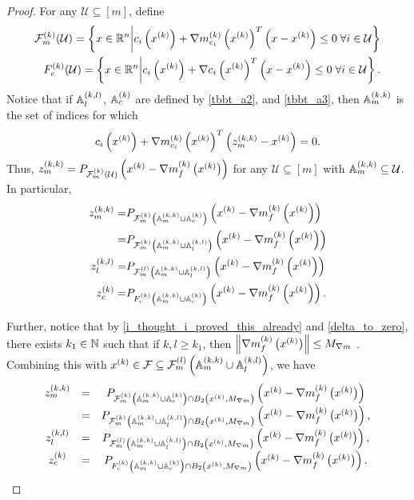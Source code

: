 \begin{proof}

For any $\mathcal U \subseteq [m]$, define
\begin{align*}
\feasiblek(\mathcal U)  = \left\{x \in \Rn \bigg| c_i\left(\xk\right) + \gmcik^T\left(x - \xk\right) \le 0 \; \forall i \in \mathcal U \right\} \\
\truefeasiblek(\mathcal U)  = \left\{x \in \Rn \bigg| c_i\left(\xk\right) + \nabla c_i\left(\xk\right)^T\left(x - \xk\right) \le 0 \; \forall i \in \mathcal U \right\}.
\end{align*}
Notice that if $\Alk$, $\Ack$
are defined by
\cref{tbbt_a2}, and \cref{tbbt_a3},
then $\Amk$ is the set of indices for which 
\begin{align*}
c_i\left(\xk\right) + \gmcik^T\left(\zmk - \xk\right) = 0.
\end{align*}
Thus, $\zmk = P_{\feasiblek(\mathcal U)}\left(\xk - \gk\right)$ for any $\mathcal U \subseteq [m]$ with $\Amk \subseteq \mathcal U$.
In particular,
\begin{align*}
\zmk =& P_{\feasiblek\left(\Amk \cup \Ack\right)}\left(\xk - \gk\right) \\
=& P_{\feasiblek\left(\Amk \cup \Alk\right)}\left(\xk - \gk\right)\\
\zlk =& P_{\feasiblel\left(\Amk \cup \Alk\right)}\left(\xk - \gk\right) \\
\zck =& P_{\truefeasiblek\left(\Amk \cup \Ack\right)}\left(\xk - \gk\right).
\end{align*}

Further, notice that by \cref{i_thought_i_proved_this_already} and \cref{delta_to_zero}, there exists $k_1 \in \naturals$ such that if $k, l \ge k_1$, 
then
$\left\|\gk\right\| \le \maxmodelgrad$
.
Combining this with $\xk \in \feasible \subseteq \feasiblel\left(\Amk \cup \Alk\right)$, we have 
\begin{align}
\begin{array}{ccc}
\zmk &=& P_{\feasiblek\left(\Amk \cup \Ack\right) \cap B_2\left(\xk, \maxmodelgrad\right)}\left(\xk - \gk\right)  \\
     &=& P_{\feasiblek\left(\Amk \cup \Alk\right) \cap B_2\left(\xk, \maxmodelgrad\right)}\left(\xk - \gk\right), \\
\zlk &=& P_{\feasiblel\left(\Amk \cup \Alk\right) \cap B_2\left(\xk, \maxmodelgrad\right)}\left(\xk - \gk\right), \\
\zck &=& P_{\truefeasiblek\left(\Amk \cup \Ack\right) \cap B_2\left(\xk, \maxmodelgrad\right)}\left(\xk - \gk\right).
\end{array}\label{cbpt_eqn1}
\end{align}


\end{proof}
